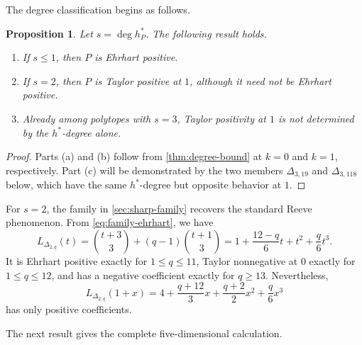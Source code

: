 \documentclass[reqno, 12pt]{article}
\numberwithin{equation}{section}
\newtheorem{proposition}[theorem]{Proposition}
\theoremstyle{definition}
\begin{document}
The degree classification begins as follows.

\begin{proposition}\label{prop:degree-one-two}
Let $s=\deg h_P^*$. The following result holds.
\begin{enumerate}
 \item[(a)] If $s\leq1$, then $P$ is Ehrhart positive.
 \item[(b)] If $s=2$, then $P$ is Taylor positive at $1$, although it need not be
 Ehrhart positive.
 \item[(c)] Already among polytopes with $s=3$, Taylor positivity at $1$ is not
 determined by the $h^*$-degree alone.
\end{enumerate}
\end{proposition}
\begin{proof}
Parts (a) and (b) follow from \cref{thm:degree-bound} at $k=0$ and $k=1$,
respectively.  Part (c) will be demonstrated by the two members
$\Delta_{3,19}$ and $\Delta_{3,118}$ below, which have the same $h^*$-degree
but opposite behavior at $1$.
\end{proof}

For $s=2$, the family in \cref{sec:sharp-family} recovers the standard
Reeve phenomenon.  From \eqref{eq:family-ehrhart}, we have 
\[ L_{\Delta_{2,q}}(t)=\binom{t+3}{3}+(q-1)\binom{t+1}{3}=1+\frac{12-q}{6}t+t^2+\frac q6t^3.
\]
It is Ehrhart positive exactly for $1\leq q\leq11$, Taylor nonnegative at
$0$ exactly for $1\leq q\leq12$, and has a negative coefficient exactly
for $q\geq13$.  Nevertheless,
\begin{equation*}
 L_{\Delta_{2,q}}(1+x)=4+\frac{q+12}{3}x+\frac{q+2}{2}x^2+\frac q6x^3
\end{equation*}
has only positive coefficients.

The next result gives the complete five-dimensional calculation.
\end{document}
